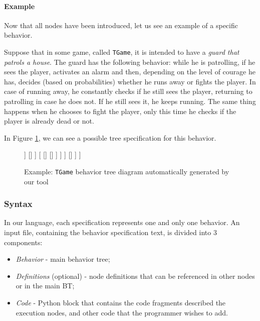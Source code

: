 \documentclass[a4paper,UKenglish,cleveref, autoref, thm-restate]{oasics-v2019}
\begin{document}
\paragraph*{Example}{
    Now that all nodes have been introduced, let us see an example of a specific behavior.

    Suppose that in some game, called \texttt{TGame},
    it is intended  to have a \emph{guard that patrols a house}.
    The guard has the following behavior: while he is patrolling, if he sees the player, activates an alarm and then,
    depending on the level of courage he has, decides (based on probabilities) whether he runs away or fights the player.
    In case of running away, he constantly checks if he still sees the player, returning to patrolling in case he does not.
    If he still sees it, he keeps running.
    The same thing happens when he chooses to fight the player, only this time he checks if the player is already dead
    or not.

    In Figure \ref{fig:example}, we can see a possible tree specification for this behavior.

    \begin{figure}[h]
        \centering
        \begin{behavior}
            [\rootnode
                [\selector
                    [\memorysequence
                        [\condition{sees player}]
                        [\action{activate alarm}]
                        [\memoryprobselector
                            [\probnodesequence{$e1$}
                                [\inverter
                                    [\condition{player dead}]
                                ]
                                []
                            ]
                            [
                                []
                                []
                            ]
                        ]
                    ]
                    []
                ]
            ]
        \end{behavior}
        \caption{Example: \texttt{TGame} behavior tree diagram automatically generated by our tool }
        \label{fig:example}
    \end{figure}
}

\subsubsection{Syntax}
In our language, each specification represents one and only one behavior.
An  input file, containing the behavior specification text, is divided into 3 components:
\begin{itemize}
    \item \textit{Behavior} - main behavior tree;
    \item \textit{Definitions} (optional) - node definitions that can be referenced in other nodes or in the main BT;
    \item \textit{Code} - Python block that contains the code fragments described the execution nodes, and other code that the programmer wishes to add.
\end{itemize}
\end{document}
